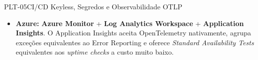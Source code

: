 \begin{pecaarq}{PLT-05}{CI/CD Keyless, Segredos e Observabilidade OTLP}{\sgcp~\nativo\enspace\saws~\nativo\enspace\sazure~\nativo}
\begin{campos}
\begin{itemize}
{        \& Alarms}, \textbf{CloudWatch Synthetics (Canaries)} para sondas de
        saúde (atenção: Canaries na AWS têm custo por execução significativamente
        maior que os \emph{uptime checks} do GCP) e \textbf{AWS X-Ray} (recebendo
        OTLP via \emph{sidecar} ADOT --- AWS Distro for OpenTelemetry --- na
        tarefa Fargate).
      \item \textbf{Azure:} \textbf{Azure Monitor} + \textbf{Log Analytics
        Workspace} + \textbf{Application Insights}. O Application Insights aceita
        OpenTelemetry nativamente, agrupa exceções equivalentes ao Error
        Reporting e oferece \emph{Standard Availability Tests} equivalentes aos
        \emph{uptime checks} a custo muito baixo.
    \end{itemize}
\end{campos}
\end{pecaarq}

